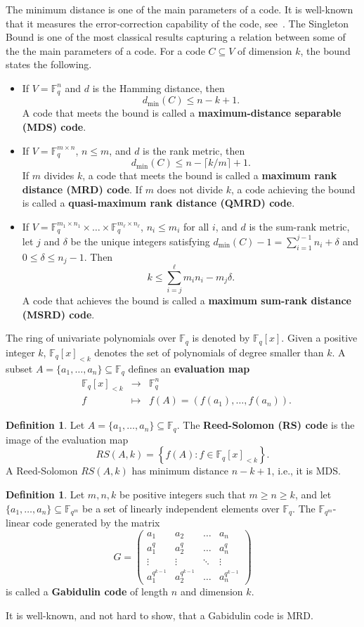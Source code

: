 \documentclass[12pt]{amsart}
\numberwithin{equation}{section}
\theoremstyle{definition}
\newtheorem{definition}[theorem]{Definition}
\newcommand{\FF}{\mathbb{F}}
\begin{document}
The minimum distance is one of the main parameters of a code. It is well-known that it measures the error-correction capability of the code, see~\cite{HP03}. The Singleton Bound is one of the most classical results capturing a relation between some of the the main parameters of a code. For a code $C \subseteq V$ of dimension $k$, the bound states the following.
\begin{itemize}
\item If $V=\FF_q^n$ and $d$ is the Hamming distance, then $$d_{\min}(C) \leq n-k+1.$$ A code that meets the bound is called a {\bf maximum-distance separable (MDS) code}.
\item If $V=\mathbb{F}_q^{m\times n}$, $n\leq m$, and $d$ is the rank metric, then
$$d_{\min}(C) \leq n - \lceil k/m \rceil + 1.$$
If $m$ divides $k$, a code that meets the bound is called a {\bf maximum rank distance (MRD) code}. If $m$ does not divide $k$, a code achieving the bound is called a {\bf quasi-maximum rank distance (QMRD) code}.
\item If $V=\mathbb{F}_q^{m_1\times n_1}\times\ldots\times\FF_q^{m_\ell\times n_\ell}$, $n_i\leq m_i$ for all $i$, and $d$ is the sum-rank metric, let $j$ and $\delta$ be the unique integers satisfying $d_{\min}(C)-1 = \sum^{j-1}_{i=1} n_i + \delta$ and $0 \leq \delta \leq n_j-1$. Then
\[k \leq \sum_{i=j}^\ell m_in_i - m_j\delta. \]
A code that achieves the bound is called a {\bf maximum sum-rank distance (MSRD) code}.
\end{itemize}

The ring of univariate polynomials over $\FF_q$ is denoted by $\FF_q[x]$. Given a positive integer $k$, $\FF_{q}[x]_{<k}$ denotes the set of polynomials of degree smaller than $k$. A subset $A=\{a_1,\ldots, a_n\}\subseteq\FF_q$ defines an {\bf evaluation map}
\[\begin{array}{lccc}
&\FF_{q}[x]_{<k} & \to & \FF_{q}^n \\
& f & \mapsto & f(A)=\left(f(a_1),\ldots, f(a_n)\right).
\end{array}\]

\begin{definition}
Let $A=\{a_1,\ldots, a_n\}\subseteq\FF_q$. The {\bf Reed-Solomon (RS) code} is the image of the evaluation map
\[ RS(A,k) = \left\{ f(A) : f \in \FF_{q}[x]_{<k} \right\}.\]
A Reed-Solomon $RS(A,k)$ has minimum distance $n-k+1$, i.e., it is MDS.
\end{definition}
\begin{definition}
Let $m, n, k$ be positive integers such that $m \geq n \geq k$, and let $\{a_1, \ldots, a_n\}\subseteq\FF_{q^m}$ be a set of linearly independent elements over $\FF_{q}$. The $\FF_{q^m}$-linear code generated by the matrix 
\[G = \begin{pmatrix}
a_1 & a_2 & \ldots & a_n\\
a_1^q & a_2^q & \ldots & a_n^q\\
\vdots & \vdots & \ddots & \vdots\\
a_1^{q^{k-1}} & a_2^{q^{k-1}} & \ldots & a_n^{q^{k-1}}
\end{pmatrix}\]
is called a {\bf Gabidulin code} of
length $n$ and dimension $k$.
\end{definition}
It is well-known, and not hard to show, that a Gabidulin code is MRD.
\end{document}
